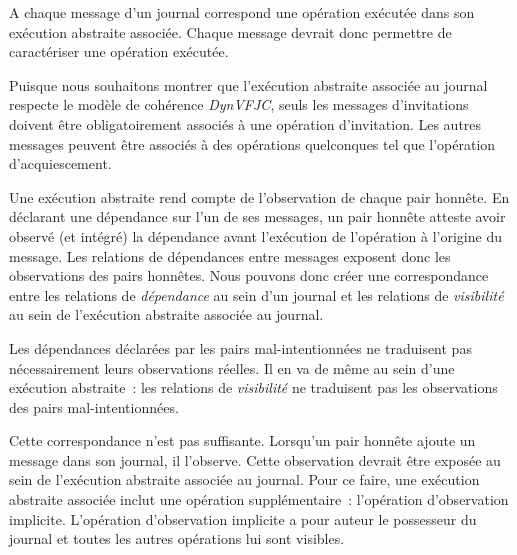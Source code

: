 A chaque message d'un journal correspond une opération exécutée dans son exécution abstraite associée.
Chaque message devrait donc permettre de caractériser une opération exécutée.

Puisque nous souhaitons montrer que l'exécution abstraite associée au journal respecte le modèle de cohérence \emph{DynVFJC}, seuls les messages d'invitations doivent être obligatoirement associés à une opération d'invitation.
Les autres messages peuvent être associés à des opérations quelconques tel que l'opération d'acquiescement.

Une exécution abstraite rend compte de l'observation de chaque pair honnête.
En déclarant une dépendance sur l'un de ses messages, un pair honnête atteste avoir observé (et intégré) la dépendance avant l'exécution de l'opération à l'origine du message.
Les relations de dépendances entre messages exposent donc les observations des pairs honnêtes.
Nous pouvons donc créer une correspondance entre les relations de \emph{dépendance} au sein d'un journal et les relations de \emph{visibilité} au sein de l'exécution abstraite associée au journal.

Les dépendances déclarées par les pairs mal-intentionnées ne traduisent pas nécessairement leurs observations réelles.
Il en va de même au sein d'une exécution abstraite~: les relations de \emph{visibilité} ne traduisent pas les observations des pairs mal-intentionnées.

Cette correspondance n'est pas suffisante.
Lorsqu'un pair honnête ajoute un message dans son journal, il l'observe.
Cette observation devrait être exposée au sein de l'exécution abstraite associée au journal.
Pour ce faire, une exécution abstraite associée inclut une opération supplémentaire~: l'opération d'observation implicite.
L'opération d'observation implicite a pour auteur le possesseur du journal et toutes les autres opérations lui sont visibles.


